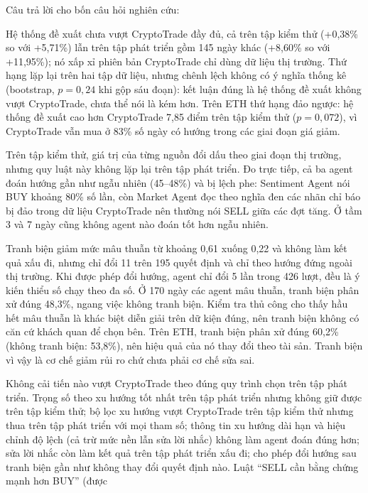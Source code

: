 Câu trả lời cho bốn câu hỏi nghiên cứu:
\begin{description}[leftmargin=1.2cm,style=nextline]
  \item[RQ1] Hệ thống đề xuất chưa vượt CryptoTrade đầy đủ, cả trên tập kiểm thử (+0,38\% so với +5,71\%) lẫn trên tập
  phát triển gồm 145 ngày khác (+8,60\% so với +11,95\%); nó xấp xỉ phiên bản CryptoTrade chỉ dùng dữ liệu thị trường.
  Thứ hạng lặp lại trên hai tập dữ liệu, nhưng chênh lệch không có ý nghĩa thống kê (bootstrap, $p=0{,}24$ khi gộp sáu
  đoạn): kết luận đúng là hệ thống đề xuất không vượt CryptoTrade, chưa thể nói là kém hơn. Trên ETH thứ hạng đảo
  ngược: hệ thống đề xuất cao hơn CryptoTrade 7,85 điểm trên tập kiểm thử ($p=0{,}072$), vì CryptoTrade vẫn mua ở 83\%
  số ngày có hướng trong các giai đoạn giá giảm.
  \item[RQ2] Trên tập kiểm thử, giá trị của từng nguồn đổi dấu theo giai đoạn thị trường, nhưng quy luật này không lặp
  lại trên tập phát triển. Đo trực tiếp, cả ba agent đoán hướng gần như ngẫu nhiên (45--48\%) và bị lệch phe: Sentiment
  Agent nói BUY khoảng 80\% số lần, còn Market Agent đọc theo nghĩa đen các nhãn chỉ báo bị đảo trong dữ liệu
  CryptoTrade nên thường nói SELL giữa các đợt tăng. Ở tầm 3 và 7 ngày cũng không agent nào đoán tốt hơn ngẫu nhiên.
  \item[RQ3] Tranh biện giảm mức mâu thuẫn từ khoảng 0,61 xuống 0,22 và không làm kết quả xấu đi, nhưng chỉ đổi 11
  trên 195 quyết định và chỉ theo hướng đứng ngoài thị trường. Khi được phép đổi hướng, agent chỉ đổi 5 lần trong 426
  lượt, đều là ý kiến thiểu số chạy theo đa số. Ở 170 ngày các agent mâu thuẫn, tranh biện phân xử đúng 48,3\%, ngang
  việc không tranh biện. Kiểm tra thủ công cho thấy hầu hết mâu thuẫn là khác biệt diễn giải trên dữ kiện đúng, nên
  tranh biện không có căn cứ khách quan để chọn bên. Trên ETH, tranh biện phân xử đúng 60,2\% (không tranh biện:
  53,8\%), nên hiệu quả của nó thay đổi theo tài sản. Tranh biện vì vậy là cơ chế giảm rủi ro chứ chưa phải cơ chế sửa sai.
  \item[RQ4] Không cải tiến nào vượt CryptoTrade theo đúng quy trình chọn trên tập phát triển. Trọng số theo xu hướng tốt
  nhất trên tập phát triển nhưng không giữ được trên tập kiểm thử; bộ lọc xu hướng vượt CryptoTrade trên tập kiểm thử
  nhưng thua trên tập phát triển với mọi tham số; thông tin xu hướng dài hạn và hiệu chỉnh độ lệch (cả trừ mức nền lẫn sửa lời nhắc)
  không làm agent đoán đúng hơn; sửa lời nhắc còn làm kết quả trên tập phát triển xấu đi; cho phép
  đổi hướng sau tranh biện gần như không thay đổi quyết định nào. Luật ``SELL cần bằng chứng mạnh hơn BUY'' (được

\end{description}

